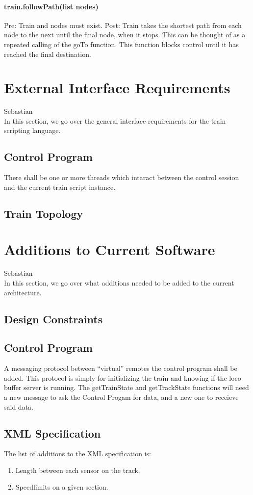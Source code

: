 \documentclass[a4paper,11pt,notitlepage]{article}
\def\CS{Control Progam\xspace}
\begin{document}
\paragraph{train.followPath(list nodes)} Pre: Train and nodes must exist. Post: Train takes the shortest path from each node to the next until the final node, when it stops. This can be thought of as a repeated calling of the goTo function. This function blocks control until it has reached the final destination.

\newpage
\section{External Interface Requirements}
Sebastian\\
    In this section, we go over the general interface requirements for the train scripting language.
\subsection{Control Program}
    There shall be one or more threads which intaract between the control session and the current train script instance.
\subsection{Train Topology}

\newpage
\section{Additions to Current Software}
Sebastian \\
    In this section, we go over what additions needed to be added to the
    current architecture.
\subsection{Design Constraints}
\subsection{Control Program}
    A messaging protocol between ``virtual'' remotes the control program shall be added.  This protocol is simply for initializing the train and knowing if the loco buffer server is running. The getTrainState and getTrackState functions will need a new message to ask the \CS for data, and a new one to receieve said data.
\subsection{XML Specification}
    The list of additions to the XML specification is:
\begin{enumerate}
    \item Length between each sensor on the track.
    \item Speedlimits on a given section.
\end{enumerate}
\end{document}

